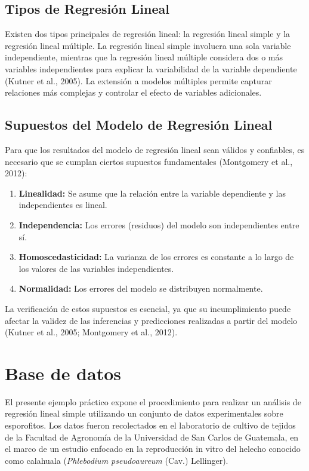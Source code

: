 \documentclass[
  spanish,
  a4paper,
  DIV=11,
  numbers=noendperiod,
  onepage,
  openany]{scrreprt}
\begin{document}
\subsection{Tipos de Regresión
Lineal}\label{tipos-de-regresiuxf3n-lineal}

Existen dos tipos principales de regresión lineal: la regresión lineal
simple y la regresión lineal múltiple. La regresión lineal simple
involucra una sola variable independiente, mientras que la regresión
lineal múltiple considera dos o más variables independientes para
explicar la variabilidad de la variable dependiente (Kutner et al.,
2005). La extensión a modelos múltiples permite capturar relaciones más
complejas y controlar el efecto de variables adicionales.

\subsection{Supuestos del Modelo de Regresión
Lineal}\label{supuestos-del-modelo-de-regresiuxf3n-lineal}

Para que los resultados del modelo de regresión lineal sean válidos y
confiables, es necesario que se cumplan ciertos supuestos fundamentales
(Montgomery et al., 2012):

\begin{enumerate}
\def\labelenumi{\arabic{enumi}.}
\item
  \textbf{Linealidad:} Se asume que la relación entre la variable
  dependiente y las independientes es lineal.
\item
  \textbf{Independencia:} Los errores (residuos) del modelo son
  independientes entre sí.
\item
  \textbf{Homoscedasticidad:} La varianza de los errores es constante a
  lo largo de los valores de las variables independientes.
\item
  \textbf{Normalidad:} Los errores del modelo se distribuyen
  normalmente.
\end{enumerate}

La verificación de estos supuestos es esencial, ya que su incumplimiento
puede afectar la validez de las inferencias y predicciones realizadas a
partir del modelo (Kutner et al., 2005; Montgomery et al., 2012).

\section{Base de datos}\label{base-de-datos-1}

El presente ejemplo práctico expone el procedimiento para realizar un
análisis de regresión lineal simple utilizando un conjunto de datos
experimentales sobre esporofitos. Los datos fueron recolectados en el
laboratorio de cultivo de tejidos de la Facultad de Agronomía de la
Universidad de San Carlos de Guatemala, en el marco de un estudio
enfocado en la reproducción in vitro del helecho conocido como calahuala
(\emph{Phlebodium pseudoaureum} (Cav.) Lellinger).
\end{document}
